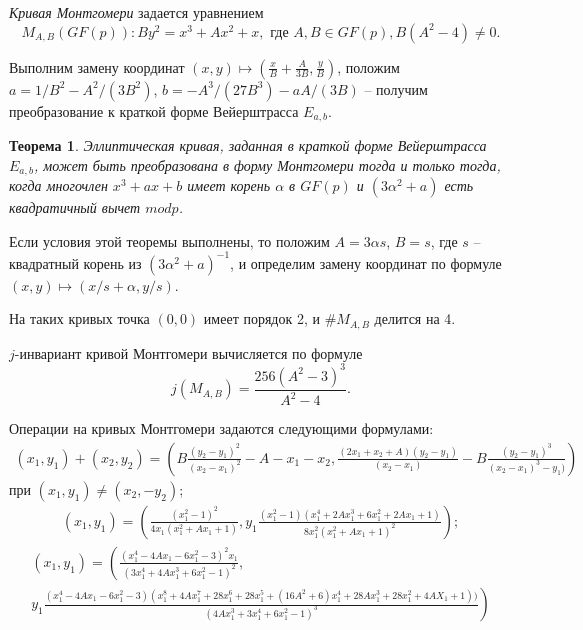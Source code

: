 \documentclass[a4paper,12pt]{article}
\newtheorem{theorem}{Теорема}
\theoremstyle{definition}
\begin{document}
\emph{Кривая Монтгомери} задается уравнением 
\begin{equation}\label{monty}
M_{A,B}(GF(p)): By^2=x^3+Ax^2+x, \text{ где } A,B\in GF(p), B(A^2-4)\neq 0.
\end{equation}

Выполним замену координат $(x,y)\mapsto\left(\frac{x}{B}+\frac{A}{3B},\frac{y}{B}\right)$, положим  $a=1/B^2-A^2/(3B^2)$, $b=-A^3/(27B^3)-aA/(3B)$ 
-- получим преобразование к краткой форме Вейерштрасса $E_{a,b}$.

\begin{theorem} Эллиптическая кривая, заданная в краткой форме Вейерштрасса $E_{a,b}$,
 может быть преобразована в форму Монтгомери тогда и только тогда, когда многочлен $x^3+ax+b$ 
имеет корень $\alpha$ в $GF(p)$ и $(3\alpha^2+a)$ есть квадратичный вычет $mod p$.
\end{theorem}

Если условия этой теоремы выполнены, то положим $A=3\alpha s$, $B=s$, где $s$ -- квадратный корень из $(3\alpha^2+a)^{-1}$, 
и определим замену координат по формуле $(x,y)\mapsto (x/s+\alpha,y/s)$.

На таких кривых точка $(0,0)$ имеет порядок 2, и $\#M_{A,B}$ делится на 4. 

$j$-инвариант кривой Монтгомери вычисляется по формуле
\begin{equation}
j(M_{A,B})=\frac{256(A^2-3)^3}{A^2-4}.
\end{equation}

Операции на кривых Монтгомери задаются следующими формулами:
\small
\begin{multline*}
(x_1,y_1)+(x_2,y_2)=\left(B\frac{(y_2-y_1)^2}{(x_2-x_1)^2}-A-x_1-x_2, \frac{(2x_1+x_2+A)(y_2-y_1)}{(x_2-x_1)}-B\frac{(y_2-y_1)^3}{(x_2-x_1)^3-y_1)}\right)
\end{multline*}
при $(x_1,y_1)\neq(x_2,-y_2)$;
\begin{multline*}
[2](x_1,y_1)= \left(\frac{(x_1^2-1)^2}{4x_1(x_1^2+Ax_1+1)} , y_1\frac{(x_1^2-1)(x_1^4+2Ax_1^3+6x_1^2+2Ax_1+1)}{8x_1^2(x_1^2+Ax_1+1)^2}\right);
\end{multline*}
\begin{multline*}
[3](x_1,y_1)= \left(\frac{(x_1^4-4Ax_1-6x_1^2-3)^2x_1}{(3x_1^4+4Ax_1^3+6x_1^2-1)^2}\right., \\
\left.y_1\frac{(x_1^4-4Ax_1-6x_1^2-3)(x_1^8+4Ax_1^7+28x_1^6+28x_1^5+(16A^2+6)x_1^4+28Ax_1^3+28x_1^2+4AX_1+1))}{(4Ax_1^3+3x_1^4+6x_1^2-1)^3}\right)
\end{multline*}
\large
\end{document}
